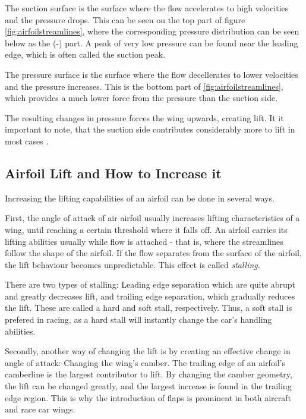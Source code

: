   The suction surface is the surface where the flow accelerates to high velocities and the pressure drops. This can be seen on the top part of figure \ref{fig:airfoilstreamlines}, where the corresponding pressure distribution can be seen below as the (-) part. A peak of very low pressure can be found near the leading edge, which is often called the suction peak.

  The pressure surface is the surface where the flow decellerates to lower velocities and the pressure increases. This is the bottom part of \ref{fig:airfoilstreamlines}, which provides a much lower force from the pressure than the suction side.

  The resulting changes in pressure forces the wing upwards, creating lift. It it important to note, that the suction side contributes considerably more to lift in most cases \cite{jkatz}.

  \subsection{Airfoil Lift and How to Increase it}

    Increasing the lifting capabilities of an airfoil can be done in several ways.

    First, the angle of attack of air airfoil usually increases lifting characteristics of a wing, until reaching a certain threshold where it falls off. An airfoil carries its lifting abilities usually while flow is attached - that is, where the streamlines follow the shape of the airfoil. If the flow separates from the surface of the airfoil, the lift behaviour becomes unpredictable. This effect is called \emph{stalling}.

    There are two types of stalling: Leading edge separation which are quite abrupt and greatly decreases lift, and trailing edge separation, which gradually reduces the lift. These are called a hard and soft stall, respectively. Thus, a soft stall is prefered in racing, as a hard stall will instantly change the car's handling abilities.

    Secondly, another way of changing the lift is by creating an effective change in angle of attack: Changing the wing's camber. The trailing edge of an airfoil's camberline is the largest contributor to lift. By changing the camber geometry, the lift can be changed greatly, and the largest increase is found in the trailing edge region. This is why the introduction of flaps is prominent in both aircraft and race car wings.

